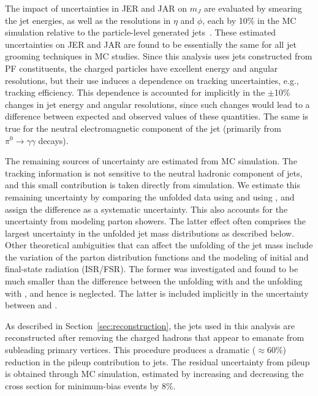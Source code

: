 The impact of uncertainties in JER and JAR on $m_J$ are evaluated by
smearing the jet energies, as well as the resolutions in $\eta$ and
$\phi$, each by 10\% in the MC simulation relative to the
particle-level generated jets~\cite{citeJEC}. 
These estimated uncertainties on JER and JAR are found to be
essentially the same for all jet grooming techniques in MC studies. 
Since this analysis uses jets constructed from PF constituents, the
charged particles have excellent energy and angular
resolutions, but their use induces a dependence on tracking
uncertainties, e.g., tracking efficiency. This dependence is accounted for
implicitly in the $\pm$10\% changes in jet energy and angular
resolutions, since such changes would lead to a difference between
expected and observed values of these quantities. The same is true for the
neutral electromagnetic
component of the jet (primarily from $\pi^0 \rightarrow \gamma\gamma$
decays). 

The remaining sources of uncertainty are estimated from MC simulation.
The tracking information is not sensitive to the neutral hadronic
component of jets, and this small contribution is taken
directly from simulation. 
We estimate this remaining uncertainty by comparing the unfolded data using \PYTHIA 
and using \HERWIG, and assign the difference as a systematic uncertainty.
This also accounts for the uncertainty from modeling parton showers. 
The latter effect often comprises the largest uncertainty in the unfolded jet mass
distributions as described below. 
Other theoretical ambiguities that can affect the unfolding of the jet
mass include the variation of the parton distribution functions and
the modeling of initial and final-state radiation (ISR/FSR). The former
was investigated and found to be much smaller than the difference
between the unfolding with \PYTHIA and the unfolding with \HERWIG, and
hence is neglected. The latter is included implicitly in the uncertainty between
\PYTHIA and \HERWIG. 

As described in Section~\ref{sec:reconstruction}, the jets used
in this analysis are reconstructed after removing
the charged hadrons that appear to emanate from subleading primary
vertices.  
This procedure produces a dramatic (${\approx} 60\%$) reduction in the pileup
contribution to jets. 
The residual uncertainty from pileup is obtained through MC simulation, 
estimated by increasing and decreasing the cross section for minimum-bias events by 8\%. 


